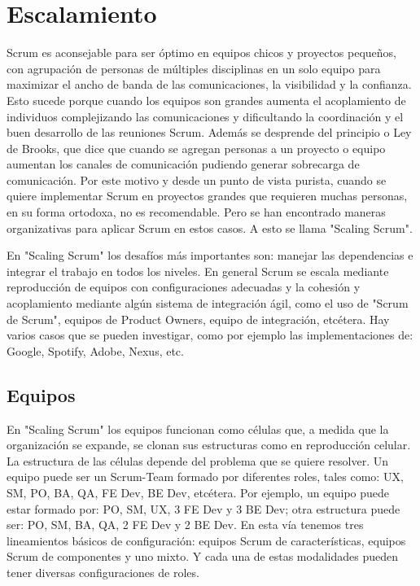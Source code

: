 \chapter{Escalamiento}

Scrum es aconsejable para ser óptimo en equipos chicos y proyectos pequeños, con agrupación de personas de múltiples disciplinas en un solo equipo para maximizar el ancho de banda de las comunicaciones, la visibilidad y la confianza. Esto sucede porque cuando los equipos son grandes aumenta el acoplamiento de individuos complejizando las comunicaciones y dificultando la coordinación y el buen desarrollo de las reuniones Scrum. Además se desprende del principio o Ley de Brooks, que dice que cuando se agregan personas a un proyecto o equipo aumentan los canales de comunicación pudiendo generar sobrecarga de comunicación. Por este motivo y desde un punto de vista purista, cuando se quiere implementar Scrum en proyectos grandes que requieren muchas personas, en su forma ortodoxa, no es recomendable. Pero se han encontrado maneras organizativas para aplicar Scrum en estos casos. A esto se llama "Scaling Scrum".

En "Scaling Scrum" los desafíos más importantes son: manejar las dependencias e integrar el trabajo en todos los niveles. En general Scrum se escala mediante reproducción de equipos con configuraciones adecuadas y la cohesión y acoplamiento mediante algún sistema de integración ágil, como el uso de "Scrum de Scrum", equipos de Product Owners, equipo de integración, etcétera. Hay varios casos que se pueden investigar, como por ejemplo las implementaciones de: Google, Spotify, Adobe, Nexus, etc.

\section{Equipos}

En "Scaling Scrum" los equipos funcionan como células que, a medida que la organización se expande, se clonan sus estructuras como en reproducción celular. La estructura de las células depende del problema que se quiere resolver. Un equipo puede ser un Scrum-Team formado por diferentes roles, tales como: UX, SM, PO, BA, QA, FE Dev, BE Dev, etcétera. Por ejemplo, un equipo puede estar formado por: PO, SM, UX, 3 FE Dev y 3 BE Dev; otra estructura puede ser: PO, SM, BA, QA, 2 FE Dev y 2 BE Dev. En esta vía tenemos tres lineamientos básicos de configuración: equipos Scrum de características, equipos Scrum de componentes y uno mixto. Y cada una de estas modalidades pueden tener diversas configuraciones de roles.



